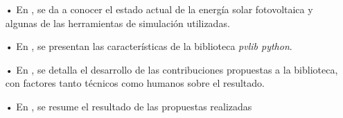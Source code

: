 \begin{itemize}

    \item[•] En , se da a conocer el estado actual de la energía solar fotovoltaica y algunas de las herramientas de simulación utilizadas.

    \item[•] En , se presentan las características de la biblioteca \textit{pvlib python}.

    \item[•] En , se detalla el desarrollo de las contribuciones propuestas a la biblioteca, con factores tanto técnicos como humanos sobre el resultado.

    \item[•] En , se resume el resultado de las propuestas realizadas

    
\end{itemize}


